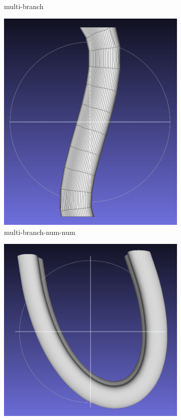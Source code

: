 \documentclass[11p, titlepage]{article}
\begin{document}
\begin{figure}[h]
\begin{subfigure}[b]{0.3\textwidth}
         \caption{multi-branch}
         \label{fig:multi_branch}
     \end{subfigure}
     \hfill
     \begin{subfigure}[b]{0.3\textwidth}
         \centering
         \includegraphics[width=\textwidth]{originals/simple}
         \caption{multi-branch-num-num}
         \label{fig:multi_branch_focussed}
     \end{subfigure}
     \hfill
     \begin{subfigure}[b]{0.3\textwidth}
         \centering
         \includegraphics[width=\textwidth]{originals/bend}

\end{subfigure}
\end{figure}
\end{document}
